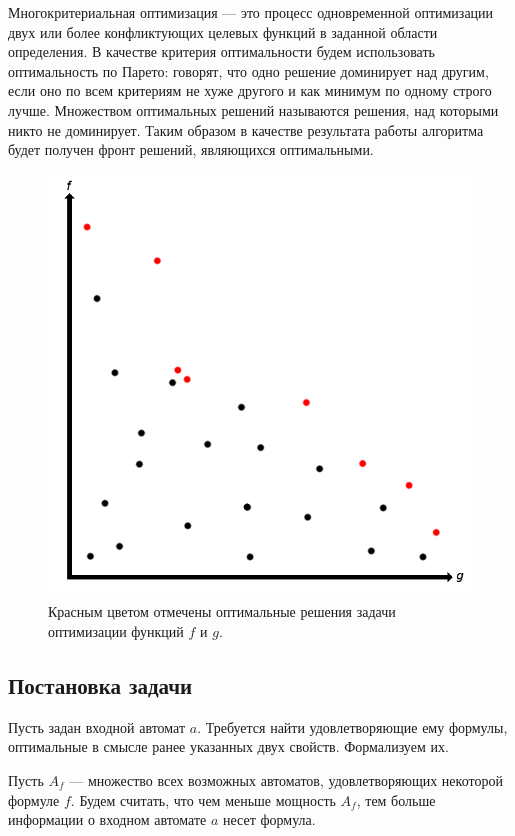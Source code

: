 \documentclass[12pt,fleqn]{article}
\begin{document}
Многокритериальная оптимизация --- это процесс одновременной оптимизации двух или более конфликтующих целевых функций
в заданной области определения. В качестве критерия оптимальности будем использовать оптимальность по Парето:
говорят, что одно решение доминирует над другим, если оно по всем критериям не хуже другого и как минимум по одному
строго лучше. Множеством оптимальных решений называются решения, над которыми никто не доминирует. Таким образом
в качестве результата работы алгоритма будет получен фронт решений, являющихся оптимальными.

\begin{figure}[!hb]
  \centering
    \includegraphics[scale=0.4]{opt.png}
  \caption{Красным цветом отмечены оптимальные решения задачи оптимизации функций $f$ и $g$.}
\end{figure}

\subsection{Постановка задачи}

Пусть задан входной автомат $a$. Требуется найти удовлетворяющие ему формулы, оптимальные в смысле ранее указанных
двух свойств. Формализуем их.

Пусть $A_f$ --- множество всех возможных автоматов, удовлетворяющих некоторой формуле $f$. Будем считать,
что чем меньше мощность $A_f$, тем больше информации о входном автомате $a$ несет формула.
\end{document}
